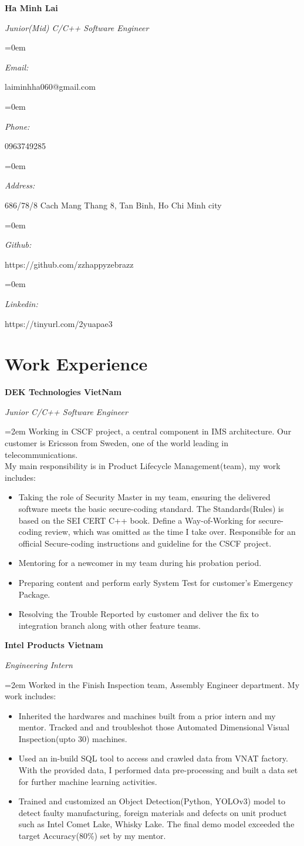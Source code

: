 \documentclass[10pt]{article}
\newlength{\spacebox}
\newcommand{\name}[1]{
\Huge %
\fontfamily{phv}\selectfont %
\begin{center} \textbf{#1} \end{center}\par
\normalsize\normalfont}
\newcommand{\motto}[1]{
  \large %
  \fontfamily{phv}\selectfont %
  \begin{center} \textsl{#1}\end{center}\par
  \normalsize \normalfont}
\newcommand{\info}[2]{
  \noindent\hangindent=0em\hangafter=0
  \parbox{\spacebox}{%
  \textit{#1}} %
  #2 \par} %
\newcommand{\work}[4]{
  \noindent  \textbf{#1}
  \hfill 
\framebox{%
  \parbox{9em}{%
  \centering\textbf{#2}}} \par
  \noindent \textit{#3} \par
  \vspace*{0.5em}
  \noindent\hangindent=2em\hangafter=0 \small #4 
\normalsize \par}
\begin{document}
\name{Ha Minh Lai}
\vspace*{-10pt}
\motto{Junior(Mid) C/C++ Software Engineer}

\info{Email:}{laiminhha060@gmail.com}
\info{Phone:}{0963749285}
\info{Address:}{686/78/8 Cach Mang Thang 8, Tan Binh, Ho Chi Minh city}
\info{Github:}{https://github.com/zzhappyzebrazz}
\info{Linkedin:}{https://tinyurl.com/2yuapae3}

\section*{Work Experience}

\work{DEK Technologies VietNam}
{Nov 2021--Now}
{Junior C/C++ Software Engineer}
{Working in CSCF project, a central component in IMS architecture.
 Our customer is Ericsson from Sweden, one of the world leading in telecommunications.
 \\ My main responsibility is in Product Lifecycle Management(team), my work includes:

\begin{itemize}
    \item Taking the role of Security Master in my team, ensuring the delivered software meets the basic secure-coding standard.
     The Standards(Rules) is based on the SEI CERT C++ book. 
     Define a Way-of-Working for secure-coding review, which was omitted as the time I take over. 
     Responsible for an official Secure-coding instructions and guideline for the CSCF project.
    \item Mentoring for a newcomer in my team during his probation period.
    \item Preparing content and perform early System Test for customer's Emergency Package.
    \item Resolving the Trouble Reported by customer and deliver the fix to integration branch along with other feature teams.
\end{itemize}}


\work{Intel Products Vietnam}
{Aug 2020--Feb 2021}
{Engineering Intern}
{Worked in the Finish Inspection team, Assembly Engineer department. My work includes:
\begin{itemize}
    \item Inherited the hardwares and machines built from a prior intern and my mentor. 
    Tracked and and troubleshot those Automated Dimensional Visual Inspection(upto 30) machines.
    \item Used an in-build SQL tool to access and crawled data from VNAT factory. 
    With the provided data, I performed data pre-processing and built a data set for further machine learning activities. 
    \item Trained and customized an Object Detection(Python, YOLOv3) model to detect faulty manufacturing, foreign materials and defects on unit product such as Intel Comet Lake, Whisky Lake. 
    The final demo model exceeded the target Accuracy(80\%) set by my mentor.
\end{itemize}}
\end{document}
